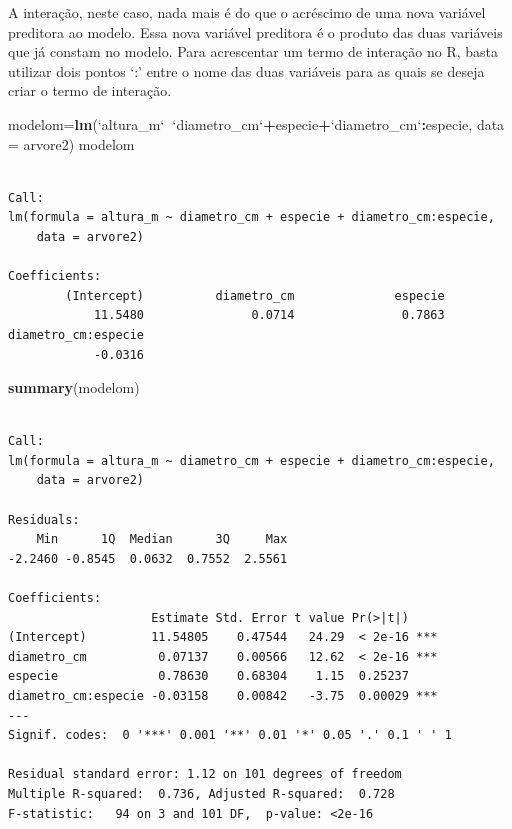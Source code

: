 \documentclass[12pt,brazil,oneside]{book}
\newenvironment{Shaded}{\begin{snugshade}}{\end{snugshade}}
\newcommand{\DataTypeTok}[1]{\textcolor[rgb]{0.13,0.29,0.53}{#1}}
\newcommand{\KeywordTok}[1]{\textcolor[rgb]{0.13,0.29,0.53}{\textbf{#1}}}
\newcommand{\NormalTok}[1]{#1}
\newcommand{\OperatorTok}[1]{\textcolor[rgb]{0.81,0.36,0.00}{\textbf{#1}}}
\newcommand{\StringTok}[1]{\textcolor[rgb]{0.31,0.60,0.02}{#1}}
\begin{document}
A interação, neste caso, nada mais é do que o acréscimo de uma nova variável preditora ao modelo. Essa nova variável preditora é o produto das duas variáveis que já constam no modelo. Para acrescentar um termo de interação no R, basta utilizar dois pontos `:' entre o nome das duas variáveis para as quais se deseja criar o termo de interação.

\begin{Shaded}
\begin{Highlighting}[]
\NormalTok{modelom=}\KeywordTok{lm}\NormalTok{(}\StringTok{`}\DataTypeTok{altura_m}\StringTok{`}\OperatorTok{~}\StringTok{`}\DataTypeTok{diametro_cm}\StringTok{`}\OperatorTok{+}\NormalTok{especie}\OperatorTok{+}\StringTok{`}\DataTypeTok{diametro_cm}\StringTok{`}\OperatorTok{:}\NormalTok{especie, }\DataTypeTok{data =}\NormalTok{ arvore2)}
\NormalTok{modelom}
\end{Highlighting}
\end{Shaded}

\begin{verbatim}

Call:
lm(formula = altura_m ~ diametro_cm + especie + diametro_cm:especie, 
    data = arvore2)

Coefficients:
        (Intercept)          diametro_cm              especie  
            11.5480               0.0714               0.7863  
diametro_cm:especie  
            -0.0316  
\end{verbatim}

\begin{Shaded}
\begin{Highlighting}[]
\KeywordTok{summary}\NormalTok{(modelom)}
\end{Highlighting}
\end{Shaded}

\begin{verbatim}

Call:
lm(formula = altura_m ~ diametro_cm + especie + diametro_cm:especie, 
    data = arvore2)

Residuals:
    Min      1Q  Median      3Q     Max 
-2.2460 -0.8545  0.0632  0.7552  2.5561 

Coefficients:
                    Estimate Std. Error t value Pr(>|t|)    
(Intercept)         11.54805    0.47544   24.29  < 2e-16 ***
diametro_cm          0.07137    0.00566   12.62  < 2e-16 ***
especie              0.78630    0.68304    1.15  0.25237    
diametro_cm:especie -0.03158    0.00842   -3.75  0.00029 ***
---
Signif. codes:  0 '***' 0.001 '**' 0.01 '*' 0.05 '.' 0.1 ' ' 1

Residual standard error: 1.12 on 101 degrees of freedom
Multiple R-squared:  0.736, Adjusted R-squared:  0.728 
F-statistic:   94 on 3 and 101 DF,  p-value: <2e-16
\end{verbatim}
\end{document}
